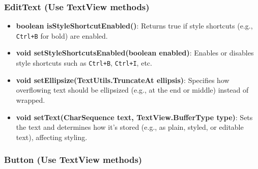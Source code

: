 \documentclass{report}
\begin{document}
\begin{itemize}
    \pagebreak 
    \subsubsection{EditText (Use TextView methods)}
    \begin{itemize}
        \item \textbf{boolean isStyleShortcutEnabled()}: Returns true if style shortcuts (e.g., \texttt{Ctrl+B} for bold) are enabled.
        \item \textbf{void setStyleShortcutsEnabled(boolean enabled)}: Enables or disables style shortcuts such as \texttt{Ctrl+B}, \texttt{Ctrl+I}, etc.
        \item \textbf{void setEllipsize(TextUtils.TruncateAt ellipsis)}: Specifies how overflowing text should be ellipsized (e.g., at the end or middle) instead of wrapped.
        \item \textbf{void setText(CharSequence text, TextView.BufferType type)}: Sets the text and determines how it’s stored (e.g., as plain, styled, or editable text), affecting styling.
    \end{itemize}


    \pagebreak 
    \subsubsection{Button (Use TextView methods)}

    \pagebreak 

\end{itemize}
\end{document}
